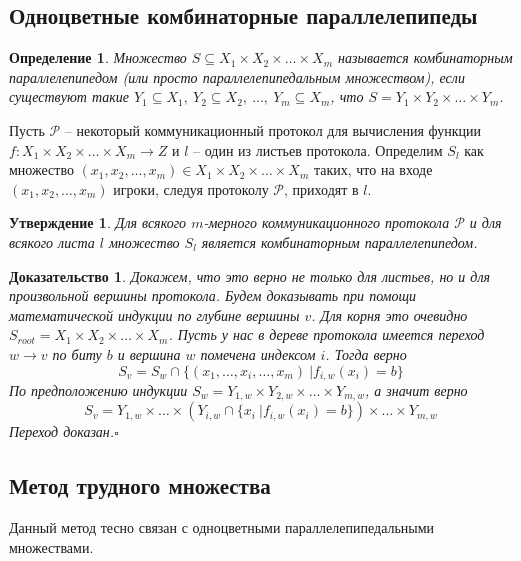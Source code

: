 \documentclass[a4paper]{article}
\newtheorem*{mclaim}{Утверждение}
\newtheorem*{mdefinition}{Определение}
\newtheorem*{msolution}{Доказательство}
\begin{document}
\subsection{Одноцветные комбинаторные параллелепипеды}
\begin{mdefinition}
	Множество $S \subseteq X_1\times X_2\times \ldots\times X_m$ называется комбинаторным параллелепипедом (или просто параллелепипедальным
	множеством), если существуют такие $Y_1 \subseteq X_1,\ Y_2 \subseteq X_2,\ \ldots,\ Y_m \subseteq X_m$, что $S = Y_1\times Y_2\times \ldots\times Y_m$.
\end{mdefinition}

Пусть $\mathcal{P}$ -- некоторый коммуникационный протокол для вычисления функции $f:X_1\times X_2\times \ldots\times X_m\rightarrow Z$ 
и $l$ -- один из листьев протокола. Определим $S_l$ как множество $(x_1, x_2, \ldots, x_m) \in X_1\times X_2\times \ldots\times X_m$ таких, что 
на входе $(x_1,x_2, \ldots, x_m)$ игроки, следуя протоколу $\mathcal{P}$, приходят в $l$.

\begin{mclaim}
    Для всякого $m$-мерного коммуникационного протокола $\mathcal{P}$ и для всякого листа $l$ множество $S_l$
    является комбинаторным параллелепипедом. 
\end{mclaim}

\begin{msolution}
     Докажем, что это верно не только для листьев, но и для произвольной вершины протокола. Будем 
     доказывать при помощи математической индукции по глубине вершины $v$. Для корня это очевидно 
     $S_{root} = X_1\times X_2\times \ldots\times X_m$. Пусть у нас в дереве протокола имеется 
     переход $w\rightarrow v$ по биту $b$ и вершина $w$ помечена индексом $i$. Тогда верно 
     $$S_v = S_w \cap \{(x_1,\ldots,x_i,\ldots,x_m)\ | f_{i,w}(x_i) = b\}$$ По предположению индукции 
     $S_w = Y_{1,w}\times Y_{2,w}\times \ldots\times Y_{m,w}$, а значит верно $$S_v = Y_{1,w}
     \times\ldots\times(Y_{i,w}\cap\{x_i\ | f_{i,w}(x_i) = b\})\times \ldots\times Y_{m,w}$$
     Переход доказан.$\square$
\end{msolution}

\subsection{Метод трудного множества}

Данный метод тесно связан с одноцветными параллелепипедальными множествами.
\end{document}
